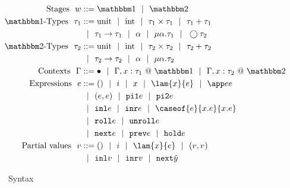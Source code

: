 
\begin{figure}
\begin{abstrsyn}
\[\begin{aligned}
\text{Stages}\ \ 
\world &::= \bbone \gbar \bbtwo \\
%
\text{\bbone-Types}\ \ 
\type_1 &::= \text{unit}\gbar\text{int}%
 \gbar \type_1 \times \type_1
 \gbar \type_1 + \type_1 \\
&\gbar \type_1 \to \type_1
 \gbar \alpha \gbar \mu \alpha.\tau_1
 \gbar \fut \type_2 \\
%
\text{\bbtwo-Types}\ \ 
\type_2 &::= \text{unit}\gbar\text{int}%
 \gbar \type_2 \times \type_2
 \gbar \type_2 + \type_2 \\
&\gbar \type_2 \to \type_2
 \gbar \alpha \gbar \mu \alpha.\tau_2 \\
%
\text{Contexts}\ \ 
\context &::=\emptyC
 \gbar \context, x:\tau_1~@~\bbone
 \gbar \context, x:\tau_2~@~\bbtwo \\
%
\text{Expressions}\ \ 
\expr &::= ()\gbar\inte\gbar\var%
 \gbar \lam {\var}{\expr} 
 \gbar \app \expr \expr \\
&\gbar (\expr, \expr) 
 \gbar \pio \expr 
 \gbar \pit \expr \\
&\gbar \inl \expr 
 \gbar \inr \expr
 \gbar \caseof {\expr}{\var.\expr}{\var.\expr}
\\ %
&\gbar \roll e
 \gbar \unroll e\\
&\gbar \next \expr 
 \gbar \prev \expr 
 \gbar \pause \expr \\
%
\text{Partial values}\ \ 
v &::= ()\gbar\inte%
 \gbar \lam{\var}{\expr} 
 \gbar (v,v) \\
&\gbar \inl v
 \gbar \inr v
 \gbar \next {\hat y} 
\end{aligned}\]
\end{abstrsyn}
\caption{\lang~Syntax}
\label{fig:grammar}
\end{figure}

